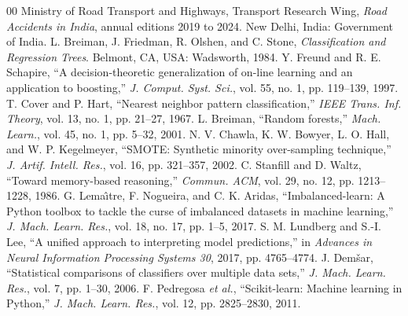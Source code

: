\documentclass[conference]{IEEEtran}
\begin{document}
\begin{thebibliography}{00}
 Ministry of Road Transport and Highways, Transport Research Wing, \emph{Road Accidents in India}, annual editions 2019 to 2024. New Delhi, India: Government of India.
 L. Breiman, J. Friedman, R. Olshen, and C. Stone, \emph{Classification and Regression Trees}. Belmont, CA, USA: Wadsworth, 1984.
 Y. Freund and R. E. Schapire, ``A decision-theoretic generalization of on-line learning and an application to boosting,'' \emph{J. Comput. Syst. Sci.}, vol. 55, no. 1, pp. 119--139, 1997.
 T. Cover and P. Hart, ``Nearest neighbor pattern classification,'' \emph{IEEE Trans. Inf. Theory}, vol. 13, no. 1, pp. 21--27, 1967.
 L. Breiman, ``Random forests,'' \emph{Mach. Learn.}, vol. 45, no. 1, pp. 5--32, 2001.
 N. V. Chawla, K. W. Bowyer, L. O. Hall, and W. P. Kegelmeyer, ``SMOTE: Synthetic minority over-sampling technique,'' \emph{J. Artif. Intell. Res.}, vol. 16, pp. 321--357, 2002.
 C. Stanfill and D. Waltz, ``Toward memory-based reasoning,'' \emph{Commun. ACM}, vol. 29, no. 12, pp. 1213--1228, 1986.
 G. Lema\^{\i}tre, F. Nogueira, and C. K. Aridas, ``Imbalanced-learn: A Python toolbox to tackle the curse of imbalanced datasets in machine learning,'' \emph{J. Mach. Learn. Res.}, vol. 18, no. 17, pp. 1--5, 2017.
 S. M. Lundberg and S.-I. Lee, ``A unified approach to interpreting model predictions,'' in \emph{Advances in Neural Information Processing Systems 30}, 2017, pp. 4765--4774.
 J. Dem\v{s}ar, ``Statistical comparisons of classifiers over multiple data sets,'' \emph{J. Mach. Learn. Res.}, vol. 7, pp. 1--30, 2006.
 F. Pedregosa \emph{et al.}, ``Scikit-learn: Machine learning in Python,'' \emph{J. Mach. Learn. Res.}, vol. 12, pp. 2825--2830, 2011.
\end{thebibliography}
\end{document}
